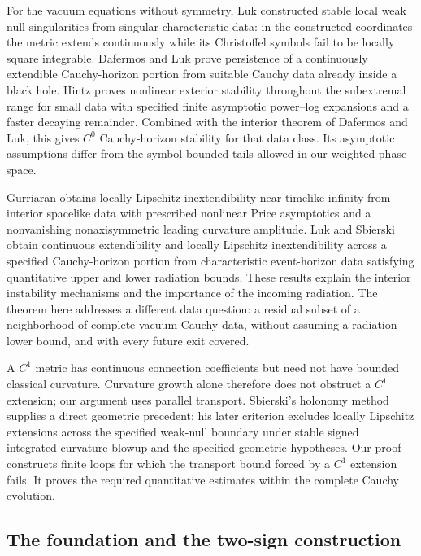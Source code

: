 For the vacuum equations without symmetry, Luk \cite{Luk2018}
constructed stable local weak null singularities from singular
characteristic data: in the constructed coordinates the metric extends
continuously while its Christoffel symbols fail to be locally square
integrable. Dafermos and Luk
\cite{DafermosLuk2025} prove persistence of a continuously extendible
Cauchy-horizon portion from suitable Cauchy data already inside a
black hole. Hintz \cite[Theorem~13.1]{Hintz2026} proves nonlinear
exterior stability throughout the subextremal range for small data
with specified finite asymptotic power--log expansions and a faster
decaying remainder. Combined with the interior theorem of Dafermos
and Luk, this gives $C^0$ Cauchy-horizon stability for that data class.
Its asymptotic assumptions differ from the symbol-bounded tails
allowed in our weighted phase space.

Gurriaran \cite[Theorem~4.5.1]{Gurriaran2026} obtains locally Lipschitz
inextendibility near timelike infinity from interior spacelike data
with prescribed nonlinear Price asymptotics and a nonvanishing
nonaxisymmetric leading curvature amplitude. Luk and Sbierski
\cite[Theorem~1.2]{LukSbierski2026} obtain continuous extendibility
and locally Lipschitz inextendibility across a specified Cauchy-horizon
portion from characteristic event-horizon data satisfying quantitative
upper and lower radiation bounds. These results explain the interior
instability mechanisms and the importance of the incoming radiation.
The theorem here addresses a different data question: a residual
subset of a neighborhood of complete vacuum Cauchy data, without
assuming a radiation lower bound, and with every future exit covered.

A $C^1$ metric has continuous connection coefficients but need not
have bounded classical curvature. Curvature growth alone therefore does
not obstruct a $C^1$ extension; our argument uses parallel transport.
Sbierski's holonomy method \cite{Sbierski2022} supplies a direct
geometric precedent; his later criterion
\cite[Theorem~3.14]{Sbierski2026} excludes locally Lipschitz extensions
across the specified weak-null boundary under
stable signed integrated-curvature blowup and the specified geometric
hypotheses. Our proof constructs finite loops for which the transport
bound forced by a $C^1$ extension fails. It proves the required
quantitative estimates within the complete Cauchy evolution.

\subsection{The foundation and the two-sign construction}

